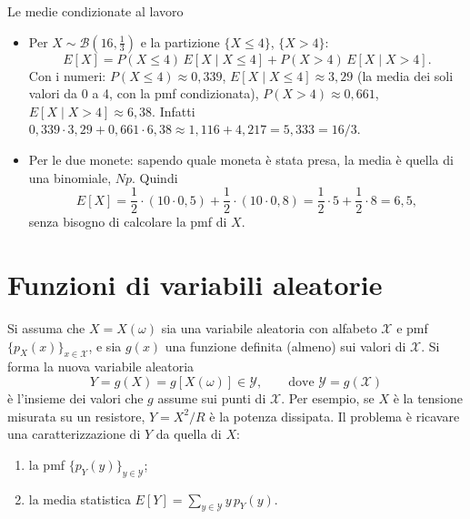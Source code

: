 \begin{esempio}{Le medie condizionate al lavoro}
\begin{itemize}
  \item Per $X \sim \mathcal{B}(16, \frac13)$ e la partizione $\{X \leq 4\}$, $\{X > 4\}$:
        \[ E[X] = P(X \leq 4)\, E[X \mid X \leq 4] + P(X > 4)\, E[X \mid X > 4] . \]
        Con i numeri: $P(X \leq 4) \approx 0{,}339$, $E[X \mid X \leq 4] \approx 3{,}29$ (la media dei soli valori
        da 0 a 4, con la pmf condizionata), $P(X > 4) \approx 0{,}661$, $E[X \mid X > 4] \approx 6{,}38$. Infatti
        $0{,}339 \cdot 3{,}29 + 0{,}661 \cdot 6{,}38 \approx 1{,}116 + 4{,}217 = 5{,}333 = 16/3$.
  \item Per le due monete: sapendo quale moneta è stata presa, la media è quella di una binomiale, $Np$. Quindi
        \[ E[X] = \frac12 \cdot (10 \cdot 0{,}5) + \frac12 \cdot (10 \cdot 0{,}8) = \frac12 \cdot 5 + \frac12 \cdot 8
           = 6{,}5 , \]
        senza bisogno di calcolare la pmf di $X$.
\end{itemize}
\end{esempio}

\section{Funzioni di variabili aleatorie}

Si assuma che $X = X(\omega)$ sia una variabile aleatoria con alfabeto $\mathcal{X}$ e pmf $\{p_X(x)\}_{x \in
\mathcal{X}}$, e sia $g(x)$ una funzione definita (almeno) sui valori di $\mathcal{X}$. Si forma la nuova variabile
aleatoria
\[ Y = g(X) = g[X(\omega)] \in \mathcal{Y} , \qquad \text{dove } \mathcal{Y} = g(\mathcal{X}) \]
è l'insieme dei valori che $g$ assume sui punti di $\mathcal{X}$. Per esempio, se $X$ è la tensione misurata su un
resistore, $Y = X^2/R$ è la potenza dissipata. Il problema è ricavare una caratterizzazione di $Y$ da quella di $X$:
\begin{enumerate}
  \item la pmf $\{p_Y(y)\}_{y \in \mathcal{Y}}$;
  \item la media statistica $E[Y] = \sum_{y \in \mathcal{Y}} y\, p_Y(y)$.
\end{enumerate}

